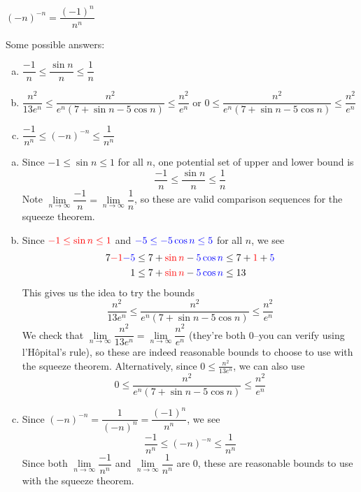 \begin{hint}
$(-n)^{-n} = \dfrac{(-1)^n}{n^n}$
\end{hint}
\begin{answer}
Some possible answers:
\begin{enumerate}[(a)]
\item $\dfrac{-1}{n}\le \dfrac{\sin n}{n}\le \dfrac{1}{n}$
\item $\dfrac{n^2}{13e^n} \le \dfrac{n^2}{e^n(7+\sin n - 5\cos n)} \le \dfrac{n^2}{e^n}$ or
      $0\le \dfrac{n^2}{e^n(7+\sin n - 5\cos n)} \le \dfrac{n^2}{e^n}$
\item $ \dfrac{-1}{n^n} \le (-n)^{-n} \le \dfrac{1}{n^n}$
\end{enumerate}
\end{answer}
\begin{solution}
\begin{enumerate}[(a)]
\item Since $-1 \leq \sin n \leq 1$ for all $n$, one potential set of upper and lower bound is
\[\dfrac{-1}{n}\le \dfrac{\sin n}{n}\le \dfrac{1}{n}\]
Note $\lim\limits_{n \to \infty}\dfrac{-1}{n} = \lim\limits_{n \to \infty}\dfrac{1}{n}$, so these are valid comparison sequences for the squeeze theorem.
\item Since $\textcolor{red}{-1\leq \sin n \leq 1}$ and $\textcolor{blue}{-5 \leq -5\cos n \leq 5}$ for all $n$, we see
\begin{align*}
7\textcolor{red}{-1}\textcolor{blue}{-5}&\leq 7+\textcolor{red}{\sin n} -\textcolor{blue}{ 5 \cos n} \leq 7+\textcolor{red}1+\textcolor{blue}5\\
1&\leq 7+\textcolor{red}{\sin n} -\textcolor{blue}{ 5 \cos n} \leq13
\end{align*}
This gives us the idea to try the bounds
\[\dfrac{n^2}{13e^n} \le \dfrac{n^2}{e^n(7+\sin n - 5\cos n)} \le \dfrac{n^2}{e^n}\]
We check that $\lim\limits_{n \to \infty}\dfrac{n^2}{13e^n}  = \lim\limits_{n \to \infty}\dfrac{n^2}{e^n} $ (they're both 0--you can verify using l'H\^{o}pital's rule), so these are indeed reasonable bounds to choose to use with the squeeze theorem. Alternatively, since $0\le \frac{n^2}{13e^n}$, we can also use 
\[ 0 \le \dfrac{n^2}{e^n(7+\sin n - 5\cos n)} \le \dfrac{n^2}{e^n}\]
\item Since $(-n)^{-n} = \dfrac{1}{(-n)^n} = \dfrac{(-1)^n}{n^n}$, we see
\[ \dfrac{-1}{n^n} \le (-n)^{-n} \le \dfrac{1}{n^n}\]
Since both $\lim\limits_{n \to \infty}\dfrac{-1}{n^n} $  and $\lim\limits_{n \to \infty}\dfrac{1}{n^n} $  are 0, these are reasonable bounds to use with the squeeze theorem.
\end{enumerate}

\end{solution}
